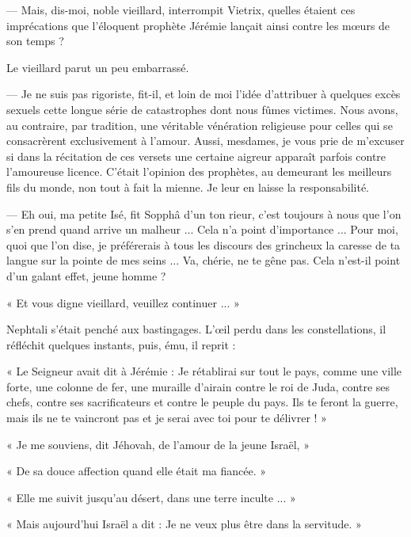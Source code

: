 \documentclass[a4paper, 11pt, oneside, polutonikogreek, french]{article}
\begin{document}
\bigskip
\centerline{\EightStarTaper}
\centerline{\EightStarTaper\EightStarTaper}
\bigskip

--- Mais, dis-moi, noble vieillard, interrompit Vietrix, quelles étaient ces imprécations que l'éloquent prophète Jérémie lançait ainsi contre les mœurs de son temps ?

Le vieillard parut un peu embarrassé.

--- Je ne suis pas rigoriste, fit-il, et loin de moi l'idée d'attribuer à quelques excès sexuels cette longue série de catastrophes dont nous fûmes victimes. Nous avons, au contraire, par tradition, une véritable vénération religieuse pour celles qui se consacrèrent exclusivement à l'amour. Aussi, mesdames, je vous prie de m'excuser si dans la récitation de ces versets une certaine aigreur apparaît parfois contre l'amoureuse licence. C'était l'opinion des prophètes, au demeurant les meilleurs fils du monde, non tout à fait la mienne. Je leur en laisse la responsabilité.

--- Eh oui, ma petite Isé, fit Sopphâ d'un ton rieur, c'est toujours à nous que l'on s'en prend quand arrive un malheur ... Cela n'a point d'importance ... Pour moi, quoi que l'on dise, je préférerais à tous les discours des grincheux la caresse de ta langue sur la pointe de mes seins ... Va, chérie, ne te gêne pas. Cela n'est-il point d'un galant effet, jeune homme ?

« Et vous digne vieillard, veuillez continuer ... »

Nephtali s'était penché aux bastingages. L'œil perdu dans les constellations, il réfléchit quelques instants, puis, ému, il reprit :

\bigskip
\centerline{\EightStarTaper}
\centerline{\EightStarTaper\EightStarTaper}
\bigskip

« Le Seigneur avait dit à Jérémie : Je rétablirai sur tout le pays, comme une ville forte, une colonne de fer, une muraille d'airain contre le roi de Juda, contre ses chefs, contre ses sacrificateurs et contre le peuple du pays. Ils te feront la guerre, mais ils ne te vaincront pas et je serai avec toi pour te délivrer ! »

« Je me souviens, dit Jéhovah, de l'amour de la jeune Israël, »

« De sa douce affection quand elle était ma fiancée. »

« Elle me suivit jusqu'au désert, dans une terre inculte ... »

« Mais aujourd'hui Israël a dit : Je ne veux plus être dans la servitude. »
\end{document}

